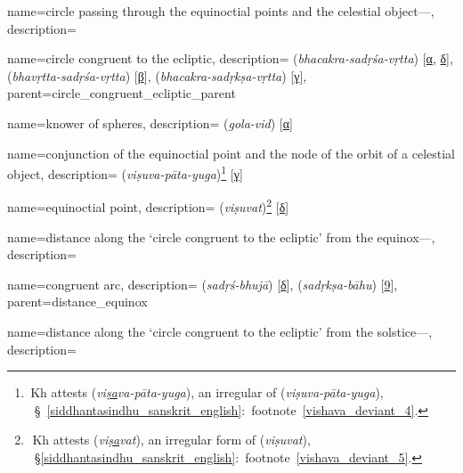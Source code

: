 {
    name={circle passing through the equinoctial points and the celestial object---},
    description={\phantom{x}\nopagebreak}
}

{
        name={circle congruent to the ecliptic},
        description={ (\textit{bhacakra-sadṛśa-vṛtta}) [\hyperlink{SEpassA}{α}, \hyperlink{SEpassD}{δ}],  (\textit{bhavṛtta-sadṛśa-vṛtta}) [\hyperlink{SEpassB}{β}],  (\textit{bhacakra-sadṛkṣa-vṛtta}) [\hyperlink{SEpassC}{γ}]},
        parent={circle_congruent_ecliptic_parent}
}

{
        name={knower of spheres},
        description={ (\textit{gola-vid}) [\hyperlink{SEpassA}{α}]}
}
     

{
        name={conjunction of the equinoctial point and the node of the orbit of a celestial object},
        description={ (\textit{viṣuva-pāta-yuga})\footnote{\,Kh attests  (\textit{vi\underline{ṣa}va-pāta-yuga}), an irregular of  (\textit{viṣuva-pāta-yuga}), \vid\ \S~\ref{siddhantasindhu_sanskrit_english}:~footnote~\ref{vishava_deviant_4}.} [\hyperlink{SEpassC}{γ}]}
}

{
        name={equinoctial point},
        description={ (\textit{viṣuvat})\footnote{\,\,Kh attests  (\textit{vi\underline{ṣa}vat}), an irregular form of  (\textit{viṣuvat}), \vid\ \S\thinspace\ref{siddhantasindhu_sanskrit_english}:~footnote~\ref{vishava_deviant_5}.} [\hyperlink{SEpassD}{δ}]}
}

{
        name={distance along the `circle congruent to the ecliptic' from the equinox---},
        description={\phantom{x}\nopagebreak}
}

{
        name={congruent arc},
        description={ (\textit{sadṛś-bhujā}) [\hyperlink{SEpassD}{δ}],  (\textit{sadṛkṣa-bāhu}) [\hyperlink{SEpass9}{9}]},
        parent={distance_equinox}
}      


{
        name={distance along the `circle congruent to the ecliptic' from the solstice---},
        description={\phantom{x}\nopagebreak}
}

